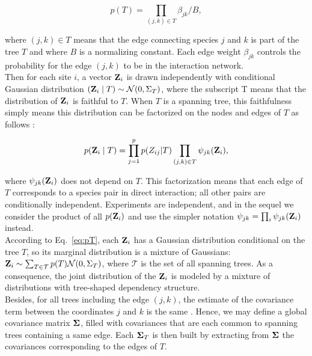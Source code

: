 \begin{equation} \label{eq:pT}
    p(T) = \prod_{(j, k) \in T} \beta_{jk} / B,
\end{equation}
 
where $(j, k) \in T$ means that the edge connecting species $j$ and $k$ is part of the tree $T$ and where $B$ is a normalizing constant. Each edge weight $\beta_{jk}$ controls the probability for the edge $(j, k)$ to be in the interaction network. \\
Then for each site $i$, a vector ${\bf Z}_i$ is drawn independently with conditional Gaussian distribution $({\bf Z}_i \mid T) \sim \mathcal{N}(0, \Sigma_T)$, where the subscript T means that the distribution of ${\bf Z}_i$ is {faithful} to $T$. When $T$ is a spanning tree, this faithfulness simply means this distribution can be factorized on the nodes and edges of $T$ as follows \citep[see][]{kirshner}:
 
\begin{equation} \label{eq:pZfact}
p({\bf Z}_i \mid T) = \prod_{j=1}^p p(Z_{ij}|T) \prod_{(j, k) \in T} \psi_{jk}({\bf Z}_i),
\end{equation}
 
where $\psi_{jk}({\bf Z}_i)$ does not depend on $T$. This factorization means that each edge of $T$ corresponds to a species pair in direct interaction;  all other pairs are conditionally independent. Experiments are independent, and in the sequel we consider the product of all $p({\bf Z}_i)$ and use the simpler notation $\psi_{jk} = \prod_i \psi_{jk}({\bf Z}_i)$ instead.\\

According to Eq.~\eqref{eq:pT}, each ${\bf Z}_i$ has a Gaussian distribution conditional on the tree $T$, so its marginal distribution is a mixture of Gaussians: ${\bf Z}_i \sim \sum_{T \in\mathcal{T}} p(T) \mathcal{N}(0, \Sigma_T)$, where $\mathcal{T}$ is the set of all spanning trees. As a consequence, the joint distribution of the ${\bf Z}_i$ is modeled by a mixture of distributions with tree-shaped dependency structure. \\
Besides, for all trees including the edge $(j, k)$, the estimate of the covariance term between the coordinates $j$ and $k$ is the same \citep[see][]{Lau96,SRS19}. Hence, we may define a global covariance matrix ${\boldsymbol{\Sigma}}$, filled with covariances that are each common to spanning trees containing a same edge. Each ${\boldsymbol{\Sigma}}_T$ is then built by extracting from ${\boldsymbol{\Sigma}}$ the covariances corresponding to the edges of $T$.
